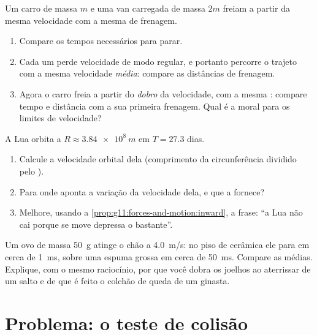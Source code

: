 \begin{exercise}[$\star\star\star$]\label{exo:g11:forces-and-motion:13}
Um carro de massa $m$ e uma van carregada de massa $2m$ freiam a partir
da mesma velocidade com a mesma  de frenagem.
\begin{enumerate}
  \item Compare os tempos necessários para parar.
  \item Cada um perde velocidade de modo regular, e portanto percorre o
        trajeto com a mesma velocidade \emph{média}: compare as distâncias
        de frenagem.
  \item Agora o carro freia a partir do \emph{dobro} da velocidade, com a
        mesma : compare tempo e distância com a sua primeira
        frenagem. Qual é a moral para os limites de velocidade?
\end{enumerate}
\end{exercise}

\begin{exercise}[$\star\star\star$]\label{exo:g11:forces-and-motion:14}
A Lua orbita a $R \approx \qty{3.84e8}{m}$ em $T = \num{27.3}$ dias.
\begin{enumerate}
  \item Calcule a velocidade orbital dela (comprimento da circunferência
        dividido pelo ).
  \item Para onde aponta a variação da velocidade dela, e que  a
        fornece?
  \item Melhore, usando a \cref{prop:g11:forces-and-motion:inward}, a
        frase: ``a Lua não cai porque se move depressa o bastante''.
\end{enumerate}
\end{exercise}

\begin{exercise}[$\star\star\star$]\label{exo:g11:forces-and-motion:15}
Um ovo de massa \qty{50}{g} atinge o chão a \qty{4.0}{m/s}: no piso de
cerâmica ele para em cerca de \qty{1}{ms}, sobre uma espuma grossa em
cerca de \qty{50}{ms}. Compare as  médias. Explique, com o mesmo
raciocínio, por que você dobra os joelhos ao aterrissar de um salto e de
que é feito o colchão de queda de um ginasta.
\end{exercise}

\section{Problema: o teste de colisão}

